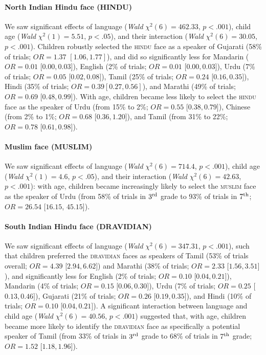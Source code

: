 \documentclass{foushee-adapted-preprint}
\begin{document}
\paragraph*{North Indian Hindu face {\small{(HINDU)}}} 
We saw significant effects of language (\textit{Wald} $\chi^2(6)=462.33$, $p<.001$), child age (\textit{Wald} $\chi^2(1)=5.51$, $p<.05$), and their interaction (\textit{Wald} $\chi^2(6)=30.05$, $p<.001$).
Children robustly selected the \textsc{hindu} face as a speaker of Gujarati (58\% of trials; $OR=1.37$ $[1.06, 1.77]$), and did so significantly less for Mandarin (%
$OR=0.01$ [$0.00, 0.03]$), 
English (2\% of trials; 
$OR=0.01$ [$0.00, 0.03]$), 
Urdu (7\% of trials; 
$OR=0.05$ [$0.02, 0.08]$), 
Tamil (25\% of trials; 
$OR=0.24$ [$0.16, 0.35]$), 
Hindi (35\% of trials; $OR=0.39 [0.27, 0.56]$), 
and 
Marathi (49\% of trials; 
$OR=0.69$ [$0.48, 0.99]$).
With age, children became less likely to select the \textsc{hindu} face as the speaker of 
Urdu (from 15\% to 2\%; 
$OR=0.55$ [$0.38, 0.79]$), 
Chinese (from 2\% to 1\%; 
$OR=0.68$ [$0.36, 1.20]$), and 
Tamil (from 31\% to 22\%; 
$OR=0.78$ [$0.61, 0.98]$).

\paragraph*{Muslim face {\small{(MUSLIM)}}}  
We saw significant effects of language (\textit{Wald} $\chi^2(6)=714.4$, $p<.001$), child age (\textit{Wald} $\chi^2(1)=4.6$, $p<.05$), and their interaction (\textit{Wald} $\chi^2(6)=42.63$, $p<.001$): with age, children became increasingly likely to select the \textsc{muslim} face as the speaker of Urdu (from 58\% of trials in $3^{\textnormal{rd}}$ grade to 93\% of trials in $7^{\textnormal{th}}$; $OR=26.54$ [$16.15$, $45.15$]).

\paragraph*{South Indian Hindu face {\small{(DRAVIDIAN)}}} 
We saw significant effects of language (\textit{Wald} $\chi^2(6)=347.31$, $p<.001$), such that children preferred the \textsc{dravidian} faces as speakers of Tamil (53\% of trials overall; $OR=4.39$ [$2.94, 6.62]$) and Marathi (38\% of trials; $OR=2.33$ [$1.56, 3.51]$), and significantly less for English (2\% of trials; 
$OR=0.10$ [$0.04, 0.21]$), Mandarin (4\% of trials; 
$OR=0.15$ [$0.06, 0.30]$), Urdu (7\% of trials; 
$OR=0.25$ [$0.13, 0.46]$), Gujarati (21\% of trials; 
$OR=0.26$ [$0.19, 0.35]$), and Hindi (10\% of trials; 
$OR=0.10$ [$0.04, 0.21]$).  
A significant interaction between language and child age (\textit{Wald} $\chi^2(6)=40.56$, $p<.001$) suggested that, with age, children became more likely to identify the \textsc{dravidian} face as specifically a potential speaker of Tamil (from 33\% of trials in $3^{\textnormal{rd}}$ grade to 68\% of trials in $7^{\textnormal{th}}$ grade; $OR=1.52$ [$1.18, 1.96]$).
%
\end{document}
